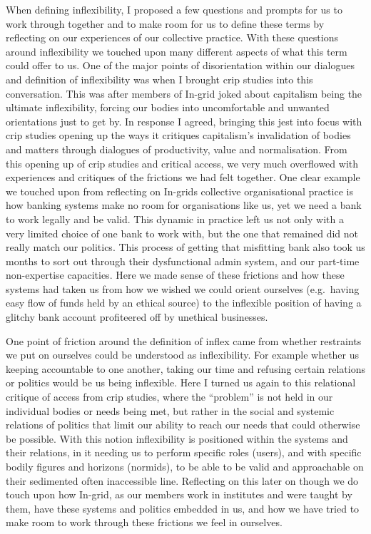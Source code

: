 When defining inflexibility, I proposed a few questions and prompts for
us to work through together and to make room for us to define these
terms by reflecting on our experiences of our collective practice. With
these questions around inflexibility we touched upon many different
aspects of what this term could offer to us. One of the major points of
disorientation within our dialogues and definition of inflexibility was
when I brought crip studies into this conversation. This was after
members of In-grid joked about capitalism being the ultimate
inflexibility, forcing our bodies into uncomfortable and unwanted
orientations just to get by. In response I agreed, bringing this jest
into focus with crip studies opening up the ways it critiques
capitalism's invalidation of bodies and matters through dialogues of
productivity, value and normalisation. From this opening up of crip
studies and critical access, we very much overflowed with experiences
and critiques of the frictions we had felt together. One clear example
we touched upon from reflecting on In-grids collective organisational
practice is how banking systems make no room for organisations like us,
yet we need a bank to work legally and be valid. This dynamic in
practice left us not only with a very limited choice of one bank to work
with, but the one that remained did not really match our politics. This
process of getting that misfitting bank also took us months to sort out
through their dysfunctional admin system, and our part-time
non-expertise capacities. Here we made sense of these frictions and how
these systems had taken us from how we wished we could orient ourselves
(e.g.~having easy flow of funds held by an ethical source) to the
inflexible position of having a glitchy bank account profiteered off by
unethical businesses.

One point of friction around the definition of inflex came from whether
restraints we put on ourselves could be understood as inflexibility. For
example whether us keeping accountable to one another, taking our time
and refusing certain relations or politics would be us being inflexible.
Here I turned us again to this relational critique of access from crip
studies, where the ``problem'' is not held in our individual bodies or
needs being met, but rather in the social and systemic relations of
politics that limit our ability to reach our needs that could otherwise
be possible. With this notion inflexibility is positioned within the
systems and their relations, in it needing us to perform specific roles
(users), and with specific bodily figures and horizons (normids), to be
able to be valid and approachable on their sedimented often inaccessible
line. Reflecting on this later on though we do touch upon how In-grid,
as our members work in institutes and were taught by them, have these
systems and politics embedded in us, and how we have tried to make room
to work through these frictions we feel in ourselves.

